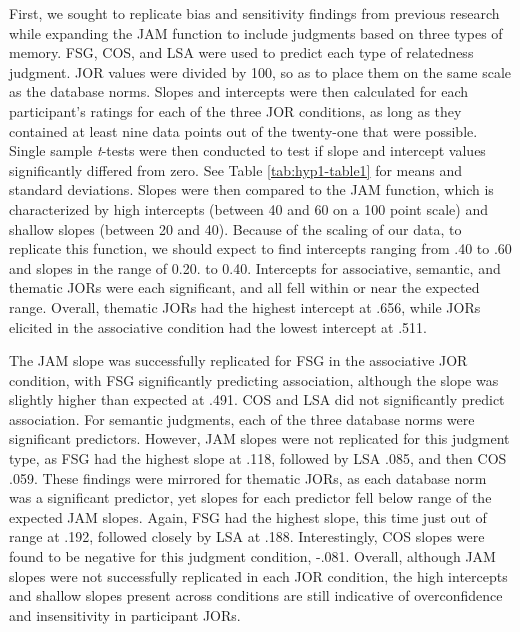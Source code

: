 \documentclass[english,,man]{apa6}
\begin{document}
First, we sought to replicate bias and sensitivity findings from
previous research while expanding the JAM function to include judgments
based on three types of memory. FSG, COS, and LSA were used to predict
each type of relatedness judgment. JOR values were divided by 100, so as
to place them on the same scale as the database norms. Slopes and
intercepts were then calculated for each participant's ratings for each
of the three JOR conditions, as long as they contained at least nine
data points out of the twenty-one that were possible. Single sample
\emph{t}-tests were then conducted to test if slope and intercept values
significantly differed from zero. See Table \ref{tab:hyp1-table1} for
means and standard deviations. Slopes were then compared to the JAM
function, which is characterized by high intercepts (between 40 and 60
on a 100 point scale) and shallow slopes (between 20 and 40). Because of
the scaling of our data, to replicate this function, we should expect to
find intercepts ranging from .40 to .60 and slopes in the range of 0.20.
to 0.40. Intercepts for associative, semantic, and thematic JORs were
each significant, and all fell within or near the expected range.
Overall, thematic JORs had the highest intercept at .656, while JORs
elicited in the associative condition had the lowest intercept at .511.

The JAM slope was successfully replicated for FSG in the associative JOR
condition, with FSG significantly predicting association, although the
slope was slightly higher than expected at .491. COS and LSA did not
significantly predict association. For semantic judgments, each of the
three database norms were significant predictors. However, JAM slopes
were not replicated for this judgment type, as FSG had the highest slope
at .118, followed by LSA .085, and then COS .059. These findings were
mirrored for thematic JORs, as each database norm was a significant
predictor, yet slopes for each predictor fell below range of the
expected JAM slopes. Again, FSG had the highest slope, this time just
out of range at .192, followed closely by LSA at .188. Interestingly,
COS slopes were found to be negative for this judgment condition, -.081.
Overall, although JAM slopes were not successfully replicated in each
JOR condition, the high intercepts and shallow slopes present across
conditions are still indicative of overconfidence and insensitivity in
participant JORs.
\end{document}
